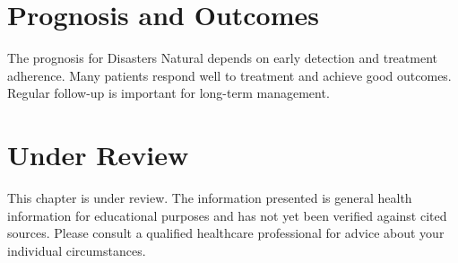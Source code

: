 \section*{Prognosis and Outcomes}
The prognosis for Disasters Natural depends on early detection and treatment adherence. Many patients respond well to treatment and achieve good outcomes. Regular follow-up is important for long-term management.
\section*{Under Review}
This chapter is under review. The information presented is general health information for educational purposes and has not yet been verified against cited sources. Please consult a qualified healthcare professional for advice about your individual circumstances.


\clearpage
